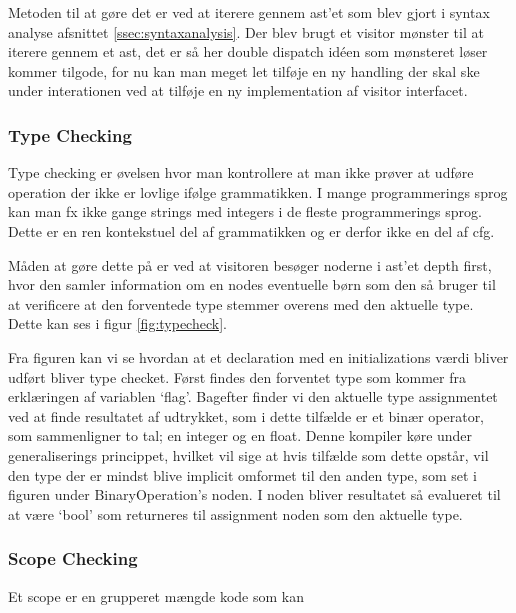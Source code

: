     Metoden til at gøre det er ved at iterere gennem \gls{ast}'et som blev gjort i syntax analyse afsnittet \ref{ssec:syntaxanalysis}. Der blev brugt et visitor mønster til at iterere gennem et \gls{ast}, det er så her double dispatch idéen som mønsteret løser kommer tilgode, for nu kan man meget let tilføje en ny handling der skal ske under interationen ved at tilføje en ny implementation af visitor interfacet.
    
\subsubsection{Type Checking}
    
    Type checking er øvelsen hvor man kontrollere at man ikke prøver at udføre operation der ikke er lovlige ifølge grammatikken. I mange programmerings sprog kan man fx ikke gange strings med integers i de fleste programmerings sprog. Dette er en ren kontekstuel del af grammatikken og er derfor ikke en del af \gls{cfg}.
    
    Måden at gøre dette på er ved at visitoren besøger noderne i \gls{ast}'et depth first, hvor den samler information om en nodes eventuelle børn som den så bruger til at verificere at den forventede type stemmer overens med den aktuelle type. Dette kan ses i figur \ref{fig:typecheck}.
    
    
    Fra figuren kan vi se hvordan at et declaration med en initializations værdi bliver udført bliver type checket. Først findes den forventet type som kommer fra erklæringen af variablen \enquote*{flag}. Bagefter finder vi den aktuelle type assignmentet ved at finde resultatet af udtrykket, som i dette tilfælde er et binær operator, som sammenligner to tal; en integer og en float. Denne kompiler køre under generaliserings princippet, hvilket vil sige at hvis tilfælde som dette opstår, vil den type der er mindst blive implicit omformet til den anden type, som set i figuren under BinaryOperation's noden. I noden bliver resultatet så evalueret til at være \enquote*{bool} som returneres til assignment noden som den aktuelle type.
    
\subsubsection{Scope Checking}

    Et scope er en grupperet mængde kode som kan 
    

